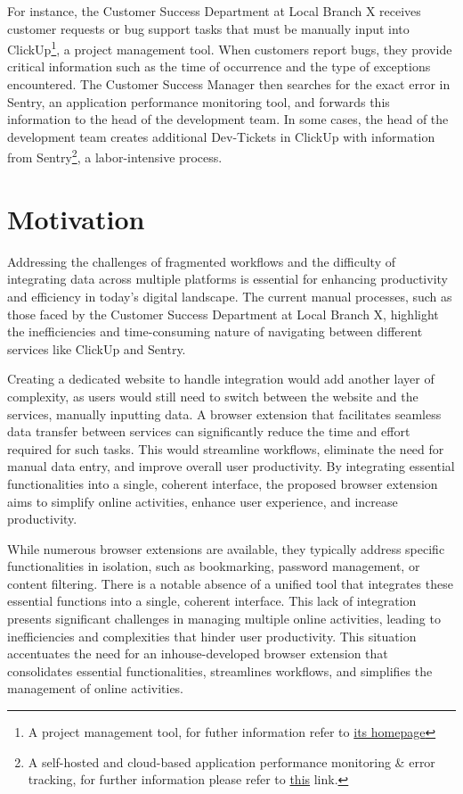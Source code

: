 For instance, the Customer Success Department at Local Branch X receives customer requests or bug support tasks that must be manually input into ClickUp\footnote{A project management tool, for futher information refer to \href{https://clickup.com/}{its homepage}}, a project management tool. When customers report bugs, they provide critical information such as the time of occurrence and the type of exceptions encountered. The Customer Success Manager then searches for the exact error in Sentry, an application performance monitoring tool, and forwards this information to the head of the development team. In some cases, the head of the development team creates additional Dev-Tickets in ClickUp with information from Sentry\footnote{A self-hosted and cloud-based application performance monitoring \& error tracking, for further information please refer to \href{https://sentry.io/welcome/}{this} link.}, a labor-intensive process.


%
%
\section{Motivation}\label{sec:intro:motivation}
Addressing the challenges of fragmented workflows and the difficulty of integrating data across multiple platforms is essential for enhancing productivity and efficiency in today's digital landscape. The current manual processes, such as those faced by the Customer Success Department at Local Branch X, highlight the inefficiencies and time-consuming nature of navigating between different services like ClickUp and Sentry.

Creating a dedicated website to handle integration would add another layer of complexity, as users would still need to switch between the website and the services, manually inputting data. A browser extension that facilitates seamless data transfer between services can significantly reduce the time and effort required for such tasks. This would streamline workflows, eliminate the need for manual data entry, and improve overall user productivity. By integrating essential functionalities into a single, coherent interface, the proposed browser extension aims to simplify online activities, enhance user experience, and increase productivity. 

While numerous browser extensions are available, they typically address specific functionalities in isolation, such as bookmarking, password management, or content filtering. There is a notable absence of a unified tool that integrates these essential functions into a single, coherent interface. This lack of integration presents significant challenges in managing multiple online activities, leading to inefficiencies and complexities that hinder user productivity. This situation accentuates the need for an inhouse-developed browser extension that consolidates essential functionalities, streamlines workflows, and simplifies the management of online activities.

